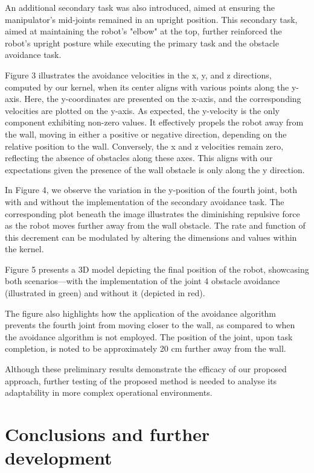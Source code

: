 \documentclass[a4paper]{article}
\begin{document}
An additional secondary task was also introduced, aimed at ensuring the manipulator's mid-joints remained in an upright position. This secondary task, aimed at maintaining the robot's "elbow" at the top, further reinforced the robot's upright posture while executing the primary task and the obstacle avoidance task.

Figure 3 illustrates the avoidance velocities in the x, y, and z directions, computed by our kernel, when its center aligns with various points along the y-axis. Here, the y-coordinates are presented on the x-axis, and the corresponding velocities are plotted on the y-axis. As expected, the y-velocity is the only component exhibiting non-zero values. It effectively propels the robot away from the wall, moving in either a positive or negative direction, depending on the relative position to the wall. Conversely, the x and z velocities remain zero, reflecting the absence of obstacles along these axes. This aligns with our expectations given the presence of the wall obstacle is only along the y direction.

In Figure 4, we observe the variation in the y-position of the fourth joint, both with and without the implementation of the secondary avoidance task. The corresponding plot beneath the image illustrates the diminishing repulsive force as the robot moves further away from the wall obstacle. The rate and function of this decrement can be modulated by altering the dimensions and values within the kernel.

Figure 5 presents a 3D model depicting the final position of the robot, showcasing both scenarios—with the implementation of the joint 4 obstacle avoidance (illustrated in green) and without it (depicted in red).

The figure also highlights how the application of the avoidance algorithm prevents the fourth joint from moving closer to the wall, as compared to when the avoidance algorithm is not employed. The position of the joint, upon task completion, is noted to be approximately 20 cm further away from the wall. 

Although these preliminary results demonstrate the efficacy of our proposed approach, further testing of the proposed method is needed to analyse  its adaptability in more complex operational environments.

\section{Conclusions and further development}
\end{document}
